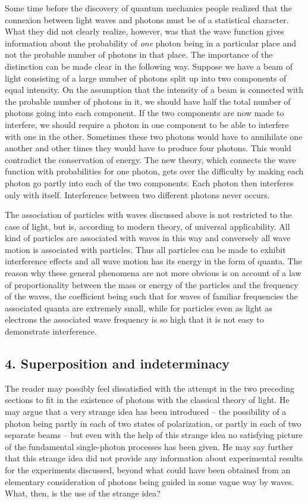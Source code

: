 Some time before the discovery of quantum mechanics people realized that the connexion between light waves and photons must be of a statistical character.  What they did not clearly realize, however, was that the wave function gives information about the probability of \emph{one} photon being in a particular place and not the probable number of photons in that place.  The importance of the distinction can be made clear in the following way.  Suppose we have a beam of light consisting of a large number of photons split up into two components of equal intensity.  On the assumption that the intensity of a beam is connected with the probable number of photons in it, we should have half the total number of photons going into each component.  If the two components are now made to interfere, we should require a photon in one component to be able to interfere with one in the other.  Sometimes these two photons would have to annihilate one another and other times they would have to produce four photons.  This would contradict the conservation of energy.  The new theory, which connects the wave function with probabilities for one photon, gets over the difficulty by making each photon go partly into each of the two components.  Each photon then interferes only with itself.  Interference between two different photons never occurs.

The association of particles with waves discussed above is not restricted to the case of light, but is, according to modern theory, of universal applicability.  All kind of particles are associated with waves in this way and conversely all wave motion is associated with particles.  Thus all particles can be made to exhibit interference effects and all wave motion has its energy in the form of quanta.  The reason why these general phenomena are not more obvious is on account of a law of proportionality between the mass or energy of the particles and the frequency of the waves, the coefficient being such that for waves of familiar frequencies the associated quanta are extremely small, while for particles even as light as electrons the associated wave frequency is so high that it is not easy to demonstrate interference.

\subsection{4. Superposition and indeterminacy}

The reader may possibly feel dissatisfied with the attempt in the two preceding sections to fit in the existence of photons with the classical theory of light.  He may argue that a very strange idea has been introduced -- the possibility of a photon being partly in each of two states of polarization, or partly in each of two separate beams -- but even with the help of this strange idea no satisfying picture of the fundamental single-photon processes has been given.  He may say further that this strange idea did not provide any information about experimental results for the experiments discussed, beyond what could have been obtained from an elementary consideration of photons being guided in some vague way by waves.  What, then, is the use of the strange idea?

